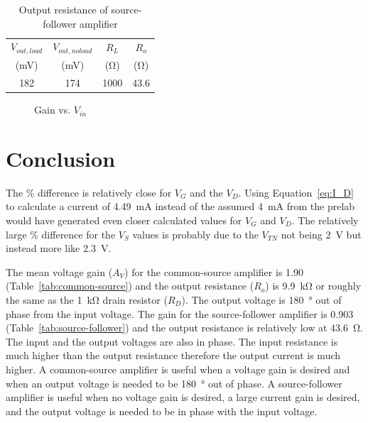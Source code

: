 \begin{table}[hbtp]
  \centering
  \begin{tabular}{cccc}
    $V_{out,load}$ & $V_{out,no load}$ & $R_L$ & $R_o$ \\
    (\si{mV}) & (\si{mV}) & (\si{\ohm}) & (\si{\ohm}) \\
    \hline
    182 & 174 & 1000 & 43.6 \\
    \end{tabular}
    \caption{\label{tab:ro_follow} Output resistance of source-follower amplifier}
\end{table}

\begin{figure}[hbtp]
  \centering
  \resizebox{1.0\textwidth}{!}{}
  \caption{\label{fig:graph} Gain vs. $V_{in}$}
\end{figure}

\newpage

\section{Conclusion}
\label{sec:conclusion}

The \% difference is relatively close for $V_G$ and the $V_D$.  Using Equation~\ref{eq:I_D} to calculate a current of \SI{4.49}{mA} instead of the assumed \SI{4}{mA} from the prelab would have generated even closer calculated values for $V_G$ and $V_D$.  The relatively large \% difference for the $V_S$ values is probably due to the $V_{TN}$ not being \SI{2}{V} but instead more like \SI{2.3}{V}.

The mean voltage gain ($A_V$) for the common-source amplifier is 1.90 (Table~\ref{tab:common-source}) and the output resistance ($R_o$) is \SI{9.9}{\kilo\ohm} or roughly the same as the \SI{1}{\kilo\ohm} drain resistor ($R_D$).  The output voltage is \SI{180}{\degree} out of phase from the input voltage.  The gain for the source-follower amplifier is 0.903 (Table~\ref{tab:source-follower}) and the output resistance is relatively low at \SI{43.6}{\ohm}.  The input and the output voltages are also in phase.   The input resistance is much higher than the output resistance therefore the output current is much higher.   A common-source amplifier is useful when a voltage gain is desired and when an output voltage is needed to be \SI{180}{\degree} out of phase.  A source-follower amplifier is useful when no voltage gain is desired, a large current gain is desired, and the output voltage is needed to be in phase with the input voltage.

